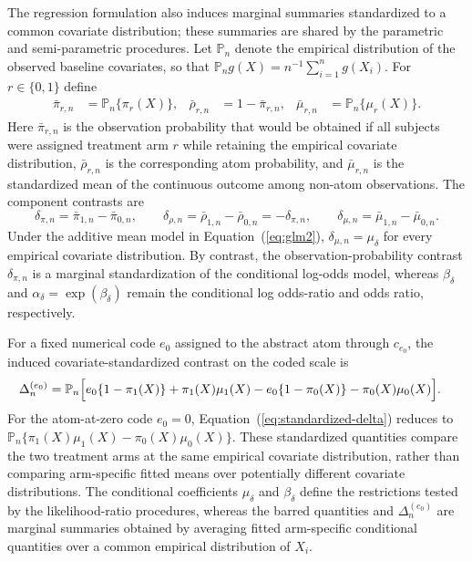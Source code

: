 \documentclass[11pt]{article}
\begin{document}
The regression formulation also induces marginal summaries standardized to a common covariate distribution; these summaries are shared by the parametric and semi-parametric procedures. Let $\mathbb{P}_n$ denote the empirical distribution of the observed baseline covariates, so that $\mathbb{P}_n g(X) = n^{-1}\sum_{i=1}^n g(X_i)$. For $r \in \{0,1\}$ define
\begin{align}
  \bar{\pi}_{r,n}
  &=
  \mathbb{P}_n\{\pi_r(X)\},
  &
  \bar{\rho}_{r,n}
  &=
  1-\bar{\pi}_{r,n},
  &
  \bar{\mu}_{r,n}
  &=
  \mathbb{P}_n\{\mu_r(X)\}.
  \label{eq:standardized-components}
\end{align}
Here $\bar{\pi}_{r,n}$ is the observation probability that would be obtained if all subjects were assigned treatment arm $r$ while retaining the empirical covariate distribution, $\bar{\rho}_{r,n}$ is the corresponding atom probability, and $\bar{\mu}_{r,n}$ is the standardized mean of the continuous outcome among non-atom observations. The component contrasts are
\[
  \delta_{\pi,n} = \bar{\pi}_{1,n}-\bar{\pi}_{0,n},
  \qquad
  \delta_{\rho,n} = \bar{\rho}_{1,n}-\bar{\rho}_{0,n} = -\delta_{\pi,n},
  \qquad
  \delta_{\mu,n} = \bar{\mu}_{1,n}-\bar{\mu}_{0,n}.
\]
Under the additive mean model in Equation~(\ref{eq:glm2}), $\delta_{\mu,n} = \mu_\delta$ for every empirical covariate distribution. By contrast, the observation-probability contrast $\delta_{\pi,n}$ is a marginal standardization of the conditional log-odds model, whereas $\beta_\delta$ and $\alpha_\delta=\exp(\beta_\delta)$ remain the conditional log odds-ratio and odds ratio, respectively.

For a fixed numerical code $e_0$ assigned to the abstract atom through $c_{e_0}$, the induced covariate-standardized contrast on the coded scale is
\begin{align}
  \Delta_n^{(e_0)}
  &=
  \mathbb{P}_n
  \Bigl[
    e_0\{1-\pi_1(X)\}
    + \pi_1(X)\mu_1(X)
    - e_0\{1-\pi_0(X)\}
    - \pi_0(X)\mu_0(X)
  \Bigr].
  \label{eq:standardized-delta}
\end{align}
For the atom-at-zero code $e_0=0$, Equation~(\ref{eq:standardized-delta}) reduces to $\mathbb{P}_n\{\pi_1(X)\mu_1(X)-\pi_0(X)\mu_0(X)\}$. These standardized quantities compare the two treatment arms at the same empirical covariate distribution, rather than comparing arm-specific fitted means over potentially different covariate distributions. The conditional coefficients $\mu_\delta$ and $\beta_\delta$ define the restrictions tested by the likelihood-ratio procedures, whereas the barred quantities and $\Delta_n^{(e_0)}$ are marginal summaries obtained by averaging fitted arm-specific conditional quantities over a common empirical distribution of $X_i$.
\end{document}

